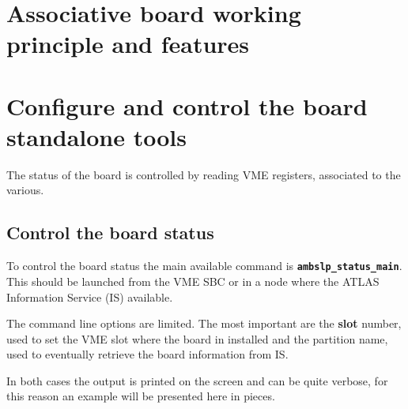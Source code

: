 \documentclass[UKenglish]{latex/atlasdoc}
\begin{document}
\section{Associative board working principle and features}


\section{Configure and control the board standalone tools}

The status of the board is controlled by reading VME registers, associated
to the various.

\subsection{Control the board status}
To control the board status the main available command is
\textbf{\texttt{ambslp\_status\_main}}. 
This should be
launched from the VME SBC or in a node where the ATLAS Information
Service (IS) available.

The command line options are limited. The most important are the \textbf{slot} 
number, used to set the VME slot where the board in installed and
the partition name, used to eventually retrieve the board
information from IS.

In both cases the output is printed on the screen and can be quite 
verbose, for this reason an example will be presented here in
pieces.
\end{document}
